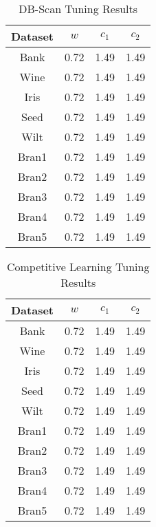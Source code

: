 \documentclass[conference]{IEEEtran}
\begin{document}
  \begin{table}[h]
  \caption{DB-Scan Tuning Results}
  \resizebox{1.3\textwidth}{!} {\begin{minipage}{\textwidth}

      \begin{tabular}{ c |c | c | c }
        Dataset & $w$ & $c_1$ & $c_2$ \\ \hline
        Bank & 0.72 & 1.49 & 1.49 \\
        Wine & 0.72 & 1.49 & 1.49 \\
        Iris & 0.72 & 1.49 & 1.49 \\
        Seed & 0.72 & 1.49 & 1.49 \\
        Wilt & 0.72 & 1.49 & 1.49 \\
        Bran1 & 0.72 & 1.49 & 1.49 \\
        Bran2 & 0.72 & 1.49 & 1.49 \\
        Bran3 & 0.72 & 1.49 & 1.49 \\
        Bran4 & 0.72 & 1.49 & 1.49 \\
        Bran5 & 0.72 & 1.49 & 1.49
      \end{tabular}

      \label{table:dbTuning}
  \end{minipage} }
  \end{table}

  \begin{table}[h]
  \caption{Competitive Learning Tuning Results}
  \resizebox{1.3\textwidth}{!} {\begin{minipage}{\textwidth}

      \begin{tabular}{ c |c | c | c }
        Dataset & $w$ & $c_1$ & $c_2$ \\ \hline
        Bank & 0.72 & 1.49 & 1.49 \\
        Wine & 0.72 & 1.49 & 1.49 \\
        Iris & 0.72 & 1.49 & 1.49 \\
        Seed & 0.72 & 1.49 & 1.49 \\
        Wilt & 0.72 & 1.49 & 1.49 \\
        Bran1 & 0.72 & 1.49 & 1.49 \\
        Bran2 & 0.72 & 1.49 & 1.49 \\
        Bran3 & 0.72 & 1.49 & 1.49 \\
        Bran4 & 0.72 & 1.49 & 1.49 \\
        Bran5 & 0.72 & 1.49 & 1.49
      \end{tabular}

      \label{table:clTuning}
  \end{minipage} }
  \end{table}
\end{document}

